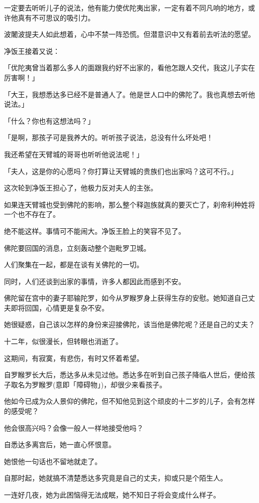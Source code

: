 \documentclass[twoside,openany]{book}
\begin{document}
一定要去听听儿子的说法，他有能力使优陀夷出家，一定有着不同凡响的地方，或许他真有不可思议的吸引力。

波闍波提夫人如此想着，心中不禁一阵恐慌。但潜意识中又有着前去听法的愿望。

净饭王接着又说：

「优陀夷曾当着那么多人的面跟我约好不出家的，看他怎跟人交代，我这儿子实在厉害啊！」

「大王，我想悉达多已经不是普通人了。他是世人口中的佛陀了。我也真想去听他说法。」

「什么？你也有这想法吗？」

「是啊，那孩子可是我养大的。听听孩子说法，总没有什么坏处吧！

我还希望在天臂城的哥哥也听听他说法呢！」

「夫人，这是你的心愿吗？你打算让天臂城的贵族们也出家吗？这可不行。」

这次轮到净饭王担心了，他极力反对夫人的主张。

如果连天臂城也受到佛陀的影响，那么整个释迦族就真的要灭亡了，刹帝利种姓将一个也不存在了。

绝不能这样。事情可不能闹大。净饭王脸上的笑容不见了。

佛陀要回国的消息，立刻轰动整个迦毗罗卫城。

人们聚集在一起，都是在谈有关佛陀的一切。

同时，人们还谈到出家的事情，许多人都因此而感到不安。

佛陀留在宫中的妻子耶输陀罗，如今从罗睺罗身上获得生存的安慰。她知道自己丈夫即将回国，心情更是复杂不安。

她很疑惑，自己该以怎样的身份来迎接佛陀，该当他是佛陀呢？还是自己的丈夫？

十二年，似很漫长，但转眼也消逝了。

这期间，有寂寞，有悲伤，有时又怀着希望。

自罗睺罗长大后，悉达多从未见过他。悉达多在听到自己孩子降临人世后，便给孩子取名为罗睺罗(意即「障碍物」)，却很少来看孩子。

他如今已成为众人景仰的佛陀，但不知他见到这个顽皮的十二岁的儿子，会有怎样的感受呢？

他会很高兴吗？会像一般人一样地接受他吗？

自悉达多离宫后，她一直心怀恨意。

她恨他一句话也不留地就走了。

自那时起，她就搞不清楚悉达多究竟是自己的丈夫，抑或只是个陌生人。

一连好几夜，她为此困恼得无法成眠，她不知日子将会变成什么样子。
\end{document}
